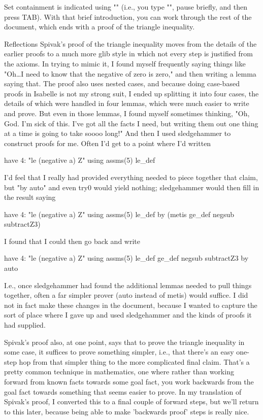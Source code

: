 Set containment is indicated using "\in" (i.e., you type "\in", pause briefly, and then press TAB). 
With that brief introduction, you can work through the rest of the document, which ends with a proof of the triangle inequality. 

Reflections
Spivak's proof of the triangle inequality moves from the details of the earlier proofs to a much more glib style in which not every step is justified from the axioms. In trying to mimic it, I found myself frequently saying things like "Oh…I need to know that the negative of zero is zero," and then writing a lemma saying that. The proof also uses nested cases, and because doing case-based proofs in Isabelle is not my strong suit, I ended up splitting it into four cases, the details of which were handled in four lemmas, which were much easier to write and prove. But even in those lemmas, I found myself sometimes thinking, "Oh, God. I'm sick of this. I've got all the facts I need, but writing them out one thing at a time is going to take soooo long!" And then I used sledgehammer to construct proofs for me. Often I'd get to a point where I'd written

   have 4: "le (negative a) Z" using assms(5) le_def 

I'd feel that I really had provided everything needed to piece together that claim, but "by auto" and even try0 would yield nothing; sledgehammer would then fill in the result saying

   have 4: "le (negative a) Z" using assms(5) le_def 
   by (metis ge_def negsub subtractZ3)

I found that I could then go back and write

   have 4: "le (negative a) Z" using assms(5) le_def ge_def   negsub subtractZ3 by auto 

I.e., once sledgehammer had found the additional lemmas needed to pull things together, often a far simpler prover (auto instead of metis) would suffice. I did not in fact make these changes in the document, because I wanted to capture the sort of place where I gave up and used sledgehammer and the kinds of proofs it had supplied. 

Spivak's proof also, at one point, says that to prove the triangle inequality in some case, it suffices to prove something simpler, i.e., that there's an easy one-step hop from that simpler thing to the more complicated final claim. That's a pretty common technique in mathematics, one where rather than working forward from known facts towards some goal fact, you work backwards from the goal fact towards something that seems easier to prove. In my translation of Spivak's proof, I converted this to a final couple of forward steps, but we'll return to this later, because being able to make 'backwards proof' steps is really nice. 

